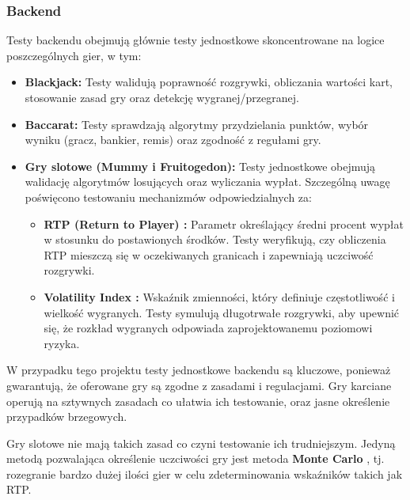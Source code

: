 \documentclass[a4paper,12pt]{article}
\begin{document}
\subsubsection{Backend}
Testy backendu obejmują głównie testy jednostkowe \cite{unit_test} skoncentrowane na logice poszczególnych gier, w tym:
\begin{itemize}[noitemsep]
    \item \textbf{Blackjack:} Testy walidują poprawność rozgrywki, obliczania wartości kart, stosowanie zasad gry oraz detekcję wygranej/przegranej.
    \item \textbf{Baccarat:} Testy sprawdzają algorytmy przydzielania punktów, wybór wyniku (gracz, bankier, remis) oraz zgodność z regułami gry.
    \item \textbf{Gry slotowe (Mummy i Fruitogedon):} Testy jednostkowe obejmują walidację algorytmów losujących oraz wyliczania wypłat. Szczególną uwagę poświęcono testowaniu mechanizmów odpowiedzialnych za:
    \begin{itemize}[noitemsep]
        \item \textbf{RTP (Return to Player) \cite{rtp}:} Parametr określający średni procent wypłat w stosunku do postawionych środków. Testy weryfikują, czy obliczenia RTP mieszczą się w oczekiwanych granicach i zapewniają uczciwość rozgrywki.
        \item \textbf{Volatility Index \cite{slot_volatility_variance}:} Wskaźnik zmienności, który definiuje częstotliwość i wielkość wygranych. Testy symulują długotrwałe rozgrywki, aby upewnić się, że rozkład wygranych odpowiada zaprojektowanemu poziomowi ryzyka.
    \end{itemize}
\end{itemize}
W przypadku tego projektu testy jednostkowe backendu są kluczowe, ponieważ gwarantują, że oferowane gry są zgodne z zasadami i regulacjami. Gry karciane operują na sztywnych zasadach co ułatwia ich testowanie, oraz jasne określenie przypadków brzegowych.

Gry slotowe nie mają takich zasad co czyni testowanie ich trudniejszym. Jedyną metodą pozwalająca określenie uczciwości gry jest metoda \textbf{Monte Carlo} \cite{monte_carlo}, tj. rozegranie bardzo dużej ilości gier w celu zdeterminowania wskaźników takich jak RTP.
\end{document}
